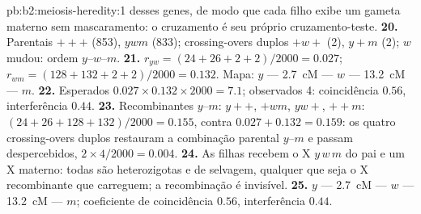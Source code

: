 \begin{solution}{pb:b2:meiosis-heredity:1}
desses genes, de modo que cada filho exibe um gameta materno sem
mascaramento: o cruzamento é seu próprio cruzamento-teste.
\textbf{20.} Parentais $+++$ (853), $ywm$ (833); crossing-overs duplos
$+w+$ (2), $y+m$ (2); $w$ mudou: ordem $y$--$w$--$m$.
\textbf{21.} $r_{yw} = (24 + 26 + 2 + 2)/2000 = 0.027$; $r_{wm} = (128
+ 132 + 2 + 2)/2000 = 0.132$. Mapa: $y$ --- \qty{2.7}{cM} --- $w$ ---
\qty{13.2}{cM} --- $m$.
\textbf{22.} Esperados $0.027\times 0.132\times 2000 = 7.1$; observados
4: coincidência $0.56$, interferência $0.44$.
\textbf{23.} Recombinantes $y$--$m$: $y++$, $+wm$, $yw+$, $++m$: $(24 +
26 + 128 + 132)/2000 = 0.155$, contra $0.027 + 0.132 = 0.159$: os
quatro crossing-overs duplos restauram a combinação parental $y$--$m$
e passam despercebidos, $2\times 4/2000 = 0.004$.
\textbf{24.} As filhas recebem o X $y\,w\,m$ do pai e um X materno:
todas são heterozigotas e de  selvagem, qualquer que seja o X
recombinante que carreguem; a recombinação é invisível.
\textbf{25.} $y$ --- \qty{2.7}{cM} --- $w$ --- \qty{13.2}{cM} --- $m$;
coeficiente de coincidência $0.56$, interferência $0.44$.
\end{solution}
